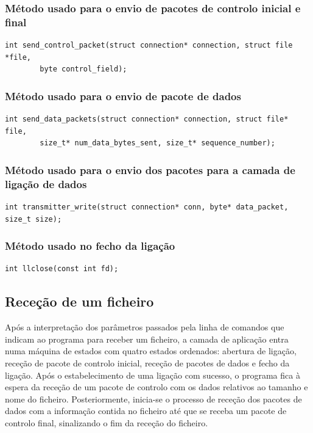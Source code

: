 \documentclass[a4paper,11pt,titlepage]{article}
\begin{document}
\subsubsection*{Método usado para o envio de pacotes de controlo inicial e final}
\begin{lstlisting}[style=customc]
int send_control_packet(struct connection* connection, struct file *file,
        byte control_field);
\end{lstlisting}

\subsubsection*{Método usado para o envio de pacote de dados}
\begin{lstlisting}[style=customc]
int send_data_packets(struct connection* connection, struct file* file,
        size_t* num_data_bytes_sent, size_t* sequence_number);
\end{lstlisting}

\subsubsection*{Método usado para o envio dos pacotes para a camada de ligação de dados}
\begin{lstlisting}[style=customc]
int transmitter_write(struct connection* conn, byte* data_packet, size_t size);
\end{lstlisting}

\subsubsection*{Método usado no fecho da ligação}
\begin{lstlisting}[style=customc]
int llclose(const int fd);
\end{lstlisting}

\subsection{Receção de um ficheiro}

Após a interpretação dos parâmetros passados pela linha de comandos que indicam ao programa para receber um ficheiro, a camada de aplicação entra numa máquina de estados com quatro estados ordenados: abertura de ligação, receção de pacote de controlo inicial, receção de pacotes de dados e fecho da ligação. Após o estabelecimento de uma ligação com sucesso, o programa fica à espera da receção de um pacote de controlo com os dados relativos ao tamanho e nome do ficheiro. Posteriormente, inicia-se o processo de receção dos pacotes de dados com a informação contida no ficheiro até que se receba um pacote de controlo final, sinalizando o fim da receção do ficheiro.
\end{document}
